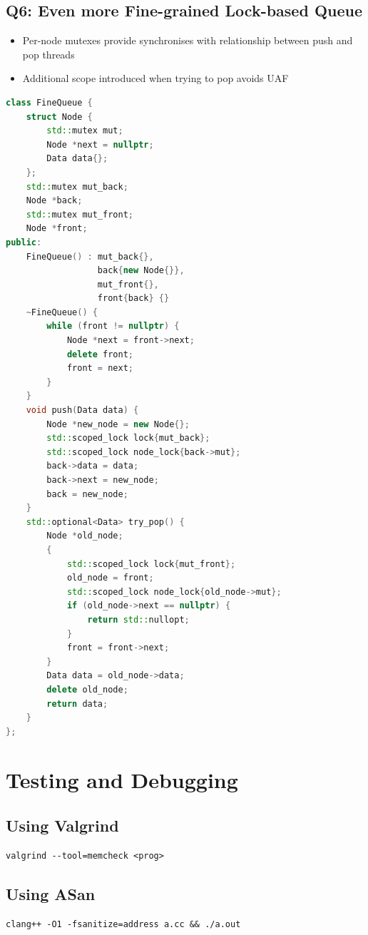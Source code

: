 \documentclass{article}
\begin{document}
\subsection{Q6: Even more Fine-grained Lock-based Queue}
\begin{itemize}
    \item Per-node mutexes provide synchronises with relationship between push and pop threads
    \item Additional scope introduced when trying to pop avoids UAF
\end{itemize}

\begin{lstlisting}[language=C++]
class FineQueue {
    struct Node {
        std::mutex mut;
        Node *next = nullptr;
        Data data{};
    };
    std::mutex mut_back;
    Node *back;
    std::mutex mut_front;
    Node *front;
public:
    FineQueue() : mut_back{},
                  back{new Node{}},
                  mut_front{},
                  front{back} {}
    ~FineQueue() {
        while (front != nullptr) {
            Node *next = front->next;
            delete front;
            front = next;
        }
    }
    void push(Data data) {
        Node *new_node = new Node{};
        std::scoped_lock lock{mut_back};
        std::scoped_lock node_lock{back->mut};
        back->data = data;
        back->next = new_node;
        back = new_node;
    }
    std::optional<Data> try_pop() {
        Node *old_node;
        {
            std::scoped_lock lock{mut_front};
            old_node = front;
            std::scoped_lock node_lock{old_node->mut};
            if (old_node->next == nullptr) {
                return std::nullopt;
            }
            front = front->next;
        }
        Data data = old_node->data;
        delete old_node;
        return data;
    }
};
\end{lstlisting}

\section{Testing and Debugging}

\subsection{Using Valgrind}
\begin{lstlisting}
valgrind --tool=memcheck <prog>
\end{lstlisting}

\subsection{Using ASan}
\begin{lstlisting}
clang++ -O1 -fsanitize=address a.cc && ./a.out
\end{lstlisting}
\end{document}
